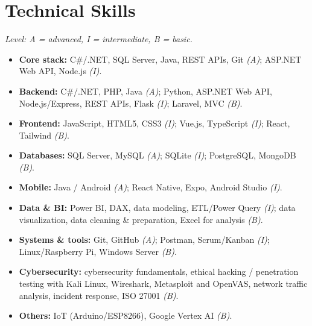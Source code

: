 \documentclass[11pt,a4paper]{article}
\begin{document}
\section{Technical Skills}
\textit{Level: A = advanced, I = intermediate, B = basic.}
\begin{itemize}
  \item \textbf{Core stack:} C\#/.NET, SQL Server, Java, REST APIs, Git \textit{(A)}; ASP.NET Web API, Node.js \textit{(I)}.
  \item \textbf{Backend:} C\#/.NET, PHP, Java \textit{(A)}; Python, ASP.NET Web API, Node.js/Express, REST APIs, Flask \textit{(I)}; Laravel, MVC \textit{(B)}.
  \item \textbf{Frontend:} JavaScript, HTML5, CSS3 \textit{(I)}; Vue.js, TypeScript \textit{(I)}; React, Tailwind \textit{(B)}.
  \item \textbf{Databases:} SQL Server, MySQL \textit{(A)}; SQLite \textit{(I)}; PostgreSQL, MongoDB \textit{(B)}.
  \item \textbf{Mobile:} Java / Android \textit{(A)}; React Native, Expo, Android Studio \textit{(I)}.
  \item \textbf{Data \& BI:} Power BI, DAX, data modeling, ETL/Power Query \textit{(I)}; data visualization, data cleaning \& preparation, Excel for analysis \textit{(B)}.
  \item \textbf{Systems \& tools:} Git, GitHub \textit{(A)}; Postman, Scrum/Kanban \textit{(I)}; Linux/Raspberry Pi, Windows Server \textit{(B)}.
  \item \textbf{Cybersecurity:} cybersecurity fundamentals, ethical hacking / penetration testing with Kali Linux, Wireshark, Metasploit and OpenVAS, network traffic analysis, incident response, ISO 27001 \textit{(B)}.
  \item \textbf{Others:} IoT (Arduino/ESP8266), Google Vertex AI \textit{(B)}.
\end{itemize}

\end{document}
